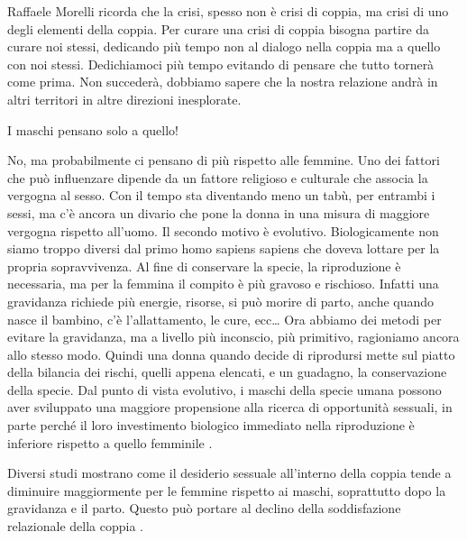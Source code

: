 \documentclass[12pt]{book} %
\begin{document}
Raffaele Morelli ricorda che la crisi, spesso non è crisi di coppia, ma crisi di uno degli elementi della coppia. Per curare
una crisi di coppia bisogna partire da curare noi stessi, dedicando più tempo non al dialogo nella coppia ma a quello
con noi stessi. Dedichiamoci più tempo evitando di pensare che tutto tornerà come prima. Non succederà, dobbiamo sapere
che la nostra relazione andrà in altri territori in altre direzioni inesplorate.

\begin{mdframed}[linewidth=1pt]
I maschi pensano solo a quello!

No, ma probabilmente ci pensano di più rispetto alle femmine. Uno dei fattori che può influenzare dipende da un
fattore religioso e culturale che associa la vergogna al sesso. Con il tempo sta diventando meno un tabù, per entrambi i sessi, ma c'è ancora un divario che pone la donna in una misura di maggiore vergogna rispetto all'uomo. Il secondo motivo è evolutivo. Biologicamente
non siamo troppo diversi dal primo homo sapiens sapiens che doveva lottare per la propria sopravvivenza. Al fine di
conservare la specie, la riproduzione è necessaria, ma per la femmina il compito è più gravoso e rischioso. Infatti una gravidanza richiede più energie, risorse, si può morire di parto, anche quando nasce il
bambino, c'è l'allattamento, le cure, ecc… Ora abbiamo dei metodi per evitare
la gravidanza, ma a livello più inconscio, più primitivo, ragioniamo ancora allo stesso modo. Quindi una donna quando
decide di riprodursi mette sul piatto della bilancia dei rischi, quelli appena elencati, e un guadagno, la
conservazione della specie. Dal punto di vista evolutivo, i maschi della specie umana possono aver sviluppato una maggiore propensione alla ricerca di opportunità sessuali, in parte perché il loro investimento biologico immediato nella riproduzione è inferiore rispetto a quello femminile
.

Diversi studi mostrano come il desiderio sessuale all'interno della coppia tende a diminuire
maggiormente per le femmine rispetto ai maschi, soprattutto dopo la gravidanza e il parto. Questo può portare al
declino della soddisfazione relazionale della coppia
.
\end{mdframed}
\end{document}
